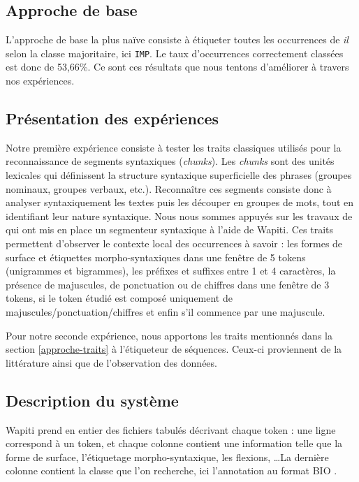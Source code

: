 \documentclass[a4paper,12pt]{article}
\begin{document}
\subsection{Approche de base}

L'approche de base la plus naïve consiste à étiqueter toutes les occurrences de \og \textit{il} \fg{}  selon la classe majoritaire, ici \verb!IMP!.
Le taux d'occurrences correctement classées est donc de 53,66\%. Ce sont ces résultats que nous tentons d'améliorer à travers nos expériences.

\subsection{Présentation des expériences}

Notre première expérience consiste à tester les traits classiques utilisés pour la reconnaissance de segments syntaxiques (\textit{chunks}). Les \textit{chunks} sont des unités lexicales qui définissent la structure syntaxique superficielle des phrases (groupes nominaux, groupes verbaux, etc.). Reconnaître ces segments consiste donc à analyser syntaxiquement les textes puis les découper en groupes de mots, tout en identifiant leur nature syntaxique. Nous nous sommes appuyés sur les travaux de \citet{constant-integrer-taln11} qui ont mis en place un segmenteur syntaxique à l'aide de Wapiti. 
Ces traits permettent d'observer le contexte local des occurrences à savoir : les formes de surface et étiquettes morpho-syntaxiques dans une fenêtre de 5 tokens (unigrammes et bigrammes), les préfixes et suffixes entre 1 et 4 caractères, la présence de majuscules, de ponctuation ou de chiffres dans une fenêtre de 3 tokens, si le token étudié est composé uniquement de majuscules/ponctuation/chiffres et enfin s'il commence par une majuscule.

Pour notre seconde expérience, nous apportons les traits mentionnés dans la section \ref{approche-traits} à l'étiqueteur de séquences. Ceux-ci proviennent de la littérature ainsi que de l'observation des données.

\subsection{Description du système}

Wapiti prend en entier des fichiers tabulés décrivant chaque token : une ligne correspond à un token, et chaque colonne contient une information telle que la forme de surface, l'étiquetage morpho-syntaxique, les flexions, \ldots La dernière colonne contient la classe que l'on recherche, ici l'annotation au format BIO .
\end{document}
